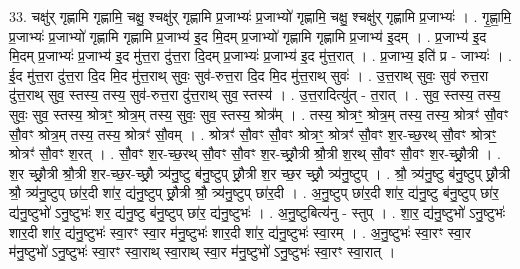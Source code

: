 \documentclass[17pt]{extarticle}
\begin{document}
33. चक्षु॑र् गृह्णामि गृह्णामि॒ चक्षु॒ श्चक्षु॑र् गृह्णामि प्र॒जाभ्यः॑ प्र॒जाभ्यो॑ गृह्णामि॒ चक्षु॒ श्चक्षु॑र् गृह्णामि प्र॒जाभ्यः॑ । . गृ॒ह्णा॒मि॒ प्र॒जाभ्यः॑ प्र॒जाभ्यो॑ गृह्णामि गृह्णामि प्र॒जाभ्य॑ इ॒द मि॒दम् प्र॒जाभ्यो॑ गृह्णामि गृह्णामि प्र॒जाभ्य॑ इ॒दम् । . प्र॒जाभ्य॑ इ॒द मि॒दम् प्र॒जाभ्यः॑ प्र॒जाभ्य॑ इ॒द मु॑त्त॒रा दु॑त्त॒रा दि॒दम् प्र॒जाभ्यः॑ प्र॒जाभ्य॑ इ॒द मु॑त्त॒रात् । . प्र॒जाभ्य॒ इति॑ प्र - जाभ्यः॑ । . ई॒द मु॑त्त॒रा दु॑त्त॒रा दि॒द मि॒द मु॑त्त॒राथ् सुवः॒ सुव॑-रुत्त॒रा दि॒द मि॒द मु॑त्त॒राथ् सुवः॑ । . उ॒त्त॒राथ् सुवः॒ सुव॑ रुत्त॒रा दु॑त्त॒राथ् सुव॒ स्तस्य॒ तस्य॒ सुव॑-रुत्त॒रा दु॑त्त॒राथ् सुव॒ स्तस्य॑ । . उ॒त्त॒रादित्यु॑त् - त॒रात् । . सुव॒ स्तस्य॒ तस्य॒ सुवः॒ सुव॒ स्तस्य॒ श्रोत्रꣳ॒॒ श्रोत्र॒म् तस्य॒ सुवः॒ सुव॒ स्तस्य॒ श्रोत्र᳚म् । . तस्य॒ श्रोत्रꣳ॒॒ श्रोत्र॒म् तस्य॒ तस्य॒ श्रोत्रꣳ॑ सौ॒वꣳ सौ॒वꣳ श्रोत्र॒म् तस्य॒ तस्य॒ श्रोत्रꣳ॑ सौ॒वम् । . श्रोत्रꣳ॑ सौ॒वꣳ सौ॒वꣳ श्रोत्रꣳ॒॒ श्रोत्रꣳ॑ सौ॒वꣳ श॒र-च्छ॒रथ् सौ॒वꣳ श्रोत्रꣳ॒॒ श्रोत्रꣳ॑ सौ॒वꣳ श॒रत् । . सौ॒वꣳ श॒र-च्छ॒रथ् सौ॒वꣳ सौ॒वꣳ श॒र-च्छ्रौ॒त्री श्रौ॒त्री श॒रथ् सौ॒वꣳ सौ॒वꣳ श॒र-च्छ्रौ॒त्री । . श॒र च्छ्रौ॒त्री श्रौ॒त्री श॒र-च्छ॒र-च्छ्रौ॒ त्र्य॑नु॒ष्टु ब॑नु॒ष्टुप् छ्रौ॒त्री श॒र च्छ॒र च्छ्रौ॒ त्र्य॑नु॒ष्टुप् । . श्रौ॒ त्र्य॑नु॒ष्टु ब॑नु॒ष्टुप् छ्रौ॒त्री श्रौ॒ त्र्य॑नु॒ष्टुप् छा॑र॒दी शा॑र॒ द्य॑नु॒ष्टुप् छ्रौ॒त्री श्रौ॒ त्र्य॑नु॒ष्टुप् छा॑र॒दी । . अ॒नु॒ष्टुप् छा॑र॒दी शा॑र॒ द्य॑नु॒ष्टु ब॑नु॒ष्टुप् छा॑र॒ द्य॑नु॒ष्टुभो॑ ऽनु॒ष्टुभः॑ शर॒ द्य॑नु॒ष्टु ब॑नु॒ष्टुप् छा॑र॒ द्य॑नु॒ष्टुभः॑ । . अ॒नु॒ष्टुबित्य॑नु - स्तुप् । . शा॒र॒ द्य॑नु॒ष्टुभो॑ ऽनु॒ष्टुभः॑ शार॒दी शा॑र॒ द्य॑नु॒ष्टुभः॑ स्वा॒रꣳ स्वा॒र म॑नु॒ष्टुभः॑ शार॒दी शा॑र॒ द्य॑नु॒ष्टुभः॑ स्वा॒रम् । . अ॒नु॒ष्टुभः॑ स्वा॒रꣳ स्वा॒र म॑नु॒ष्टुभो॑ ऽनु॒ष्टुभः॑ स्वा॒रꣳ स्वा॒राथ् स्वा॒राथ् स्वा॒र म॑नु॒ष्टुभो॑ ऽनु॒ष्टुभः॑ स्वा॒रꣳ स्वा॒रात् । \newline
\end{document}
